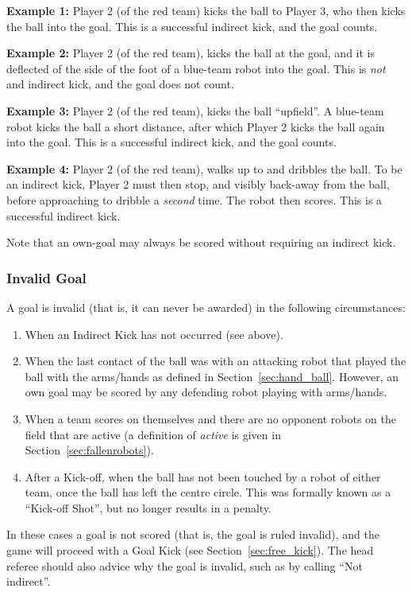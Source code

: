 \documentclass[12pt]{article}
\newcommand{\cf}{see\xspace}
\begin{document}
\textbf{Example 1:} Player 2 (of the red team) kicks the ball to Player 3, who then kicks the ball into the goal. This is a successful indirect kick, and the goal counts.

\textbf{Example 2:} Player 2 (of the red team), kicks the ball at the goal, and it is deflected of the side of the foot of a blue-team robot into the goal. This is \textit{not} and indirect kick, and the goal does not count.

\textbf{Example 3:} Player 2 (of the red team), kicks the ball ``upfield''. A blue-team robot kicks the ball a short distance, after which Player 2 kicks the ball again into the goal. This is a successful indirect kick, and the goal counts.

\textbf{Example 4:} Player 2 (of the red team), walks up to and dribbles the ball. To be an indirect kick, Player 2 must then stop, and visibly back-away from the ball, before approaching to dribble a \textit{second} time. The robot then scores. This is a successful indirect kick.

Note that an own-goal may always be scored without requiring an indirect kick.

\subsubsection{Invalid Goal}
\label{sec:invalid_goal}

A goal is invalid (that is, it can never be awarded) in the following circumstances:
\begin{enumerate}
    \item When an Indirect Kick has not occurred (see above).
    \item When the last contact of the ball was with an attacking robot that played the ball with the arms/hands as defined in Section~\ref{sec:hand_ball}. However, an own goal may be scored by any defending robot playing with arms/hands.
    \item When a team scores on themselves and there are no opponent robots on the field that are active (a definition of \emph{active} is given in Section~\ref{sec:fallenrobots}).
    \item After a Kick-off, when the ball has not been touched by a robot of either team, once the ball has left the centre circle. This was formally known as a ``Kick-off Shot'', but no longer results in a penalty.
\end{enumerate}

In these cases a goal is not scored (that is, the goal is ruled invalid), and the game will proceed with a Goal Kick (\cf Section~\ref{sec:free_kick}). The head referee should also advice why the goal is invalid, such as by calling ``Not indirect''.
\end{document}
